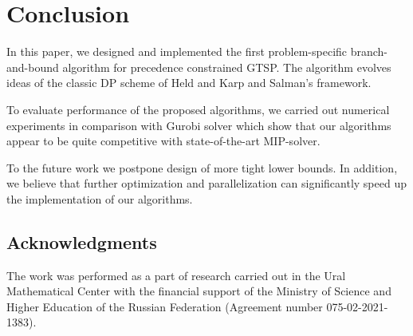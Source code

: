\section{Conclusion}\label{sec:summary}

In this paper,
we designed and implemented
the first problem-specific branch-and-bound
algorithm for precedence constrained GTSP.
The algorithm evolves ideas of the classic DP scheme of Held and Karp
and Salman's framework.

To evaluate performance of the proposed algorithms,
we carried out numerical experiments
in comparison with Gurobi solver
which show that our algorithms appear
to be quite competitive with
state-of-the-art MIP-solver.

To the future work we postpone
design of more tight lower bounds.
In addition, we believe that
further optimization and parallelization
can significantly speed up 
the implementation of our algorithms.

\subsection*{Acknowledgments}
The work was performed as a part of research carried out
in the Ural Mathematical Center with the financial support
of the Ministry of Science and Higher Education of the Russian Federation
(Agreement number 075-02-2021-1383).
